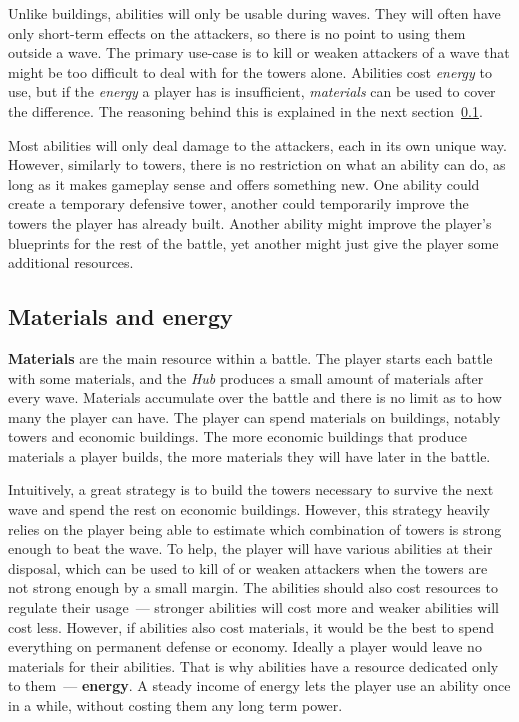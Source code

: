 Unlike buildings, abilities will only be usable during waves.
They will often have only short-term effects on the attackers, so there is no point to using them outside a wave.
The primary use-case is to kill or weaken attackers of a wave that might be too difficult to deal with for the towers alone.
Abilities cost \emph{energy} to use, but if the \emph{energy} a player has is insufficient, \emph{materials} can be used to cover the difference.
The reasoning behind this is explained in the next section~\ref{sec:design-materials-and-energy}.

Most abilities will only deal damage to the attackers, each in its own unique way.
However, similarly to towers, there is no restriction on what an ability can do, as long as it makes gameplay sense and offers something new.
One ability could create a temporary defensive tower, another could temporarily improve the towers the player has already built.
Another ability might improve the player's blueprints for the rest of the battle, yet another might just give the player some additional resources.

\subsection{Materials and energy}\label{sec:design-materials-and-energy}

\textbf{Materials} are the main resource within a battle.
The player starts each battle with some materials, and the \emph{Hub} produces a small amount of materials after every wave.
Materials accumulate over the battle and there is no limit as to how many the player can have.
The player can spend materials on buildings, notably towers and economic buildings.
The more economic buildings that produce materials a player builds, the more materials they will have later in the battle.

Intuitively, a great strategy is to build the towers necessary to survive the next wave and spend the rest on economic buildings.
However, this strategy heavily relies on the player being able to estimate which combination of towers is strong enough to beat the wave.
To help, the player will have various abilities at their disposal, which can be used to kill of or weaken attackers when the towers are not strong enough by a small margin.
The abilities should also cost resources to regulate their usage~--- stronger abilities will cost more and weaker abilities will cost less.
However, if abilities also cost materials, it would be the best to spend everything on permanent defense or economy.
Ideally a player would leave no materials for their abilities.
That is why abilities have a resource dedicated only to them~--- \textbf{energy}.
A steady income of energy lets the player use an ability once in a while, without costing them any long term power.

